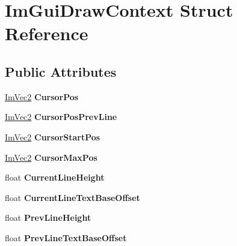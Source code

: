 \hypertarget{struct_im_gui_draw_context}{}\section{Im\+Gui\+Draw\+Context Struct Reference}
\label{struct_im_gui_draw_context}
\subsection*{Public Attributes}
\begin{DoxyCompactItemize}
\item 
\mbox{\label{struct_im_gui_draw_context_a1f566246492e0995b5182de23633dc9a}} 
\hyperlink{struct_im_vec2}{Im\+Vec2} {\bfseries Cursor\+Pos}
\item 
\mbox{\label{struct_im_gui_draw_context_adf64144a8421a21d7350d0452739eca2}} 
\hyperlink{struct_im_vec2}{Im\+Vec2} {\bfseries Cursor\+Pos\+Prev\+Line}
\item 
\mbox{\label{struct_im_gui_draw_context_aef16fef5d6781908d806479fd37f393f}} 
\hyperlink{struct_im_vec2}{Im\+Vec2} {\bfseries Cursor\+Start\+Pos}
\item 
\mbox{\label{struct_im_gui_draw_context_add16f0294ab2fd07b354da2bb99e43e1}} 
\hyperlink{struct_im_vec2}{Im\+Vec2} {\bfseries Cursor\+Max\+Pos}
\item 
\mbox{\label{struct_im_gui_draw_context_a950b71358ebfed5a884936f5cafed873}} 
float {\bfseries Current\+Line\+Height}
\item 
\mbox{\label{struct_im_gui_draw_context_af6f0a3536765c5f638fd198749bf29f1}} 
float {\bfseries Current\+Line\+Text\+Base\+Offset}
\item 
\mbox{\label{struct_im_gui_draw_context_ab4f6d19a049cff7a2fa5d1e9f5f132ab}} 
float {\bfseries Prev\+Line\+Height}
\item 
\mbox{\label{struct_im_gui_draw_context_a72d618764e8a78c5bb7879ad2fe5e308}} 
float {\bfseries Prev\+Line\+Text\+Base\+Offset}

\end{DoxyCompactItemize}
